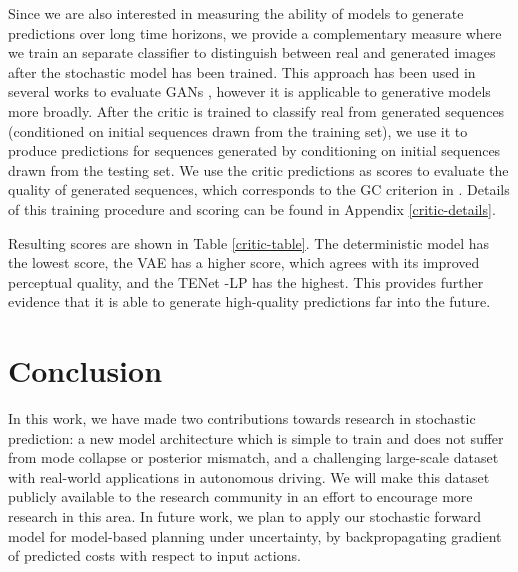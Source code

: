 \documentclass{article}
\newcommand{\modelname}{TENet }
\begin{document}
Since we are also interested in measuring the ability of models to generate predictions over long time horizons, we provide a complementary measure where we train an separate classifier to distinguish between real and generated images after the stochastic model has been trained.
This approach has been used in several works to evaluate GANs \citep{Danihelka17, Rosca17, GANeval}, however it is applicable to generative models more broadly.
After the critic is trained to classify real from generated sequences (conditioned on initial sequences drawn from the training set), we use it to produce predictions for sequences generated by conditioning on initial sequences drawn from the testing set.
We use the critic predictions as scores to evaluate the quality of generated sequences, which corresponds to the GC criterion in \citep{GANeval}.
Details of this training procedure and scoring can be found in Appendix \ref{critic-details}.

Resulting scores are shown in Table \ref{critic-table}.
The deterministic model has the lowest score, the VAE has a higher score, which agrees with its improved perceptual quality, and the \modelname-LP has the highest.
This provides further evidence that it is able to generate high-quality predictions far into the future.




\section{Conclusion}

In this work, we have made two contributions towards research in stochastic prediction: a new model architecture which is simple to train and does not suffer from mode collapse or posterior mismatch, and a challenging large-scale dataset with real-world applications in autonomous driving.
We will make this dataset publicly available to the research community in an effort to encourage more research in this area.
In future work, we plan to apply our stochastic forward model for model-based planning under uncertainty, by backpropagating gradient of predicted costs with respect to input actions.
\end{document}
